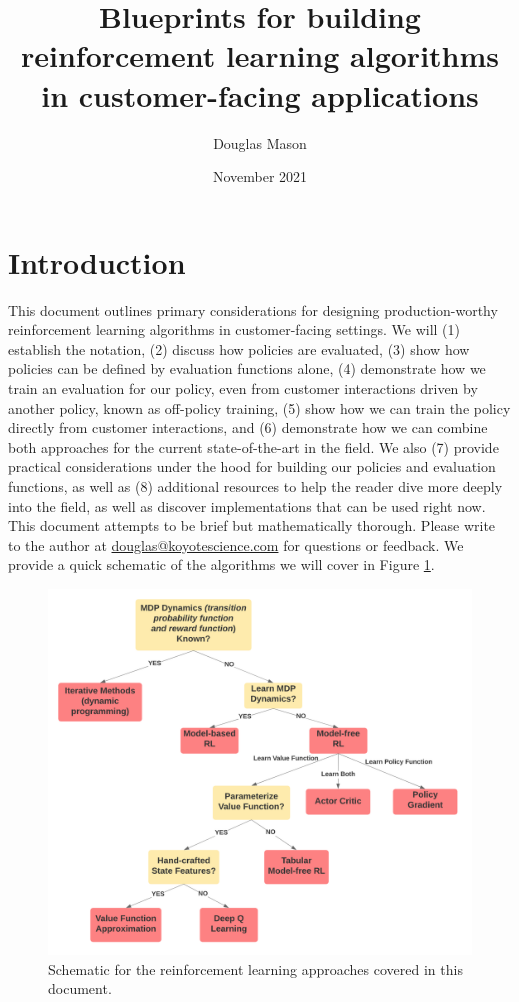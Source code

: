 \documentclass{article}
\title{Blueprints for building reinforcement learning algorithms in customer-facing applications}
\author[1]{Douglas Mason}
\affil[1]{Koyote Science, LLC \footnote{\href{http://www.koyotescience.com}{\texttt{http://www.koyotescience.com}}}}
\date{November 2021}
\begin{document}
\maketitle

\section{Introduction}
This document outlines primary considerations for designing production-worthy reinforcement learning algorithms in customer-facing settings. We will (1) establish the notation, (2) discuss how policies are evaluated, (3) show how policies can be defined by evaluation functions alone, (4) demonstrate how we train an evaluation for our policy, even from customer interactions driven by another policy, known as off-policy training, (5) show how we can train the policy directly from customer interactions, and (6) demonstrate how we can combine both approaches for the current state-of-the-art in the field. We also (7) provide practical considerations under the hood for building our policies and evaluation functions, as well as (8) additional resources to help the reader dive more deeply into the field, as well as discover implementations that can be used right now. This document attempts to be brief but mathematically thorough. Please write to the author at \href{mailto:douglas@koyotescience.com}{douglas@koyotescience.com} for questions or feedback. We provide a quick schematic of the algorithms we will cover in Figure \ref{fig:rl_schematic}.
\begin{figure}\label{fig:rl_schematic}
    \begin{center}
    \includegraphics[width=0.75\linewidth]{rl_schematic}
    \caption{Schematic for the reinforcement learning approaches covered in this document.\footnotemark}
    \end{center}
\end{figure}
\end{document}
